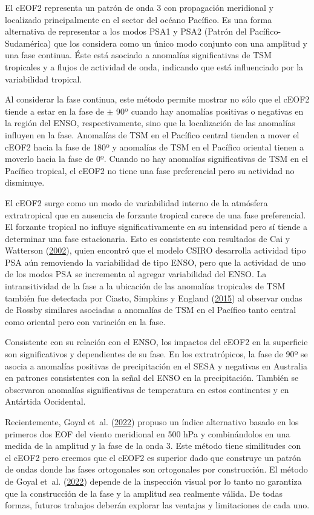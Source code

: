 \documentclass[12pt,oneside,a4paper]{reedthesis}
\begin{document}
El cEOF2 representa un patrón de onda 3 con propagación meridional y localizado principalmente en el sector del océano Pacífico.
Es una forma alternativa de representar a los modos PSA1 y PSA2 (Patrón del Pacífico-Sudamérica) que los considera como un único modo conjunto con una amplitud y una fase continua.
Éste está asociado a anomalías significativas de TSM tropicales y a flujos de actividad de onda, indicando que está influenciado por la variabilidad tropical.

Al considerar la fase continua, este método permite mostrar no sólo que el cEOF2 tiende a estar en la fase de \(\pm\) 90º cuando hay anomalías positivas o negativas en la región del ENSO, respectivamente, sino que la localización de las anomalías influyen en la fase.
Anomalías de TSM en el Pacífico central tienden a mover el cEOF2 hacia la fase de 180º y anomalías de TSM en el Pacífico oriental tienen a moverlo hacia la fase de 0º.
Cuando no hay anomalías significativas de TSM en el Pacífico tropical, el cEOF2 no tiene una fase preferencial pero su actividad no disminuye.

El cEOF2 surge como un modo de variabilidad interno de la atmósfera extratropical que en ausencia de forzante tropical carece de una fase preferencial.
El forzante tropical no influye significativamente en su intensidad pero sí tiende a determinar una fase estacionaria.
Esto es consistente con resultados de Cai y Watterson (\protect\hyperlink{ref-cai2002}{2002}), quien encontró que el modelo CSIRO desarrolla actividad tipo PSA aún removiendo la variabilidad de tipo ENSO, pero que la actividad de uno de los modos PSA se incrementa al agregar variabilidad del ENSO.
La intransitividad de la fase a la ubicación de las anomalías tropicales de TSM también fue detectada por Ciasto, Simpkins y England (\protect\hyperlink{ref-ciasto2015}{2015}) al observar ondas de Rossby similares asociadas a anomalías de TSM en el Pacífico tanto central como oriental pero con variación en la fase.

Consistente con su relación con el ENSO, los impactos del cEOF2 en la superficie son significativos y dependientes de su fase.
En los extratrópicos, la fase de 90º se asocia a anomalías positivas de precipitación en el SESA y negativas en Australia en patrones consistentes con la señal del ENSO en la precipitación.
También se observaron anomalías significativas de temperatura en estos continentes y en Antártida Occidental.

Recientemente, Goyal et~al. (\protect\hyperlink{ref-goyal2022}{2022}) propuso un índice alternativo basado en los primeros dos EOF del viento meridional en 500 hPa y combinándolos en una medida de la amplitud y la fase de la onda 3.
Este método tiene similitudes con el cEOF2 pero creemos que el cEOF2 es superior dado que construye un patrón de ondas donde las fases ortogonales son ortogonales por construcción.
El método de Goyal et~al. (\protect\hyperlink{ref-goyal2022}{2022}) depende de la inspección visual por lo tanto no garantiza que la construcción de la fase y la amplitud sea realmente válida.
De todas formas, futuros trabajos deberán explorar las ventajas y limitaciones de cada uno.
\end{document}

